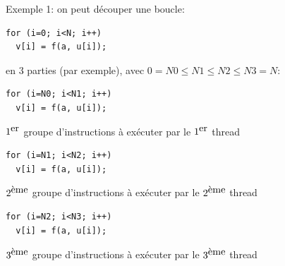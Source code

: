 \documentclass{beamer}
\begin{document}
\begin{frame}[fragile]
Exemple 1:
\vfill
on peut découper une boucle: 
\begin{lstlisting}
for (i=0; i<N; i++)
  v[i] = f(a, u[i]);
\end{lstlisting}

\vfill
en 3 parties (par exemple), avec $0 = N0 \leq N1 \leq N2 \leq N3 = N$:

\vfill
\begin{minipage}{0.52\textwidth}
	\begin{lstlisting}
for (i=N0; i<N1; i++)
  v[i] = f(a, u[i]);
\end{lstlisting}
\end{minipage}
\begin{minipage}{0.46\textwidth}
	$1^{\hbox{er}}$ groupe d'instructions à exécuter par le $1^{\hbox{er}}$ thread
\end{minipage}

\begin{minipage}{0.52\textwidth}
\begin{lstlisting}
for (i=N1; i<N2; i++)
  v[i] = f(a, u[i]);
\end{lstlisting}
\end{minipage}
\begin{minipage}{0.46\textwidth}
	$2^{\hbox{ème}}$ groupe d'instructions à exécuter par le $2^{\hbox{ème}}$ thread
\end{minipage}

\begin{minipage}{0.52\textwidth}
\begin{lstlisting}
for (i=N2; i<N3; i++)
  v[i] = f(a, u[i]);
\end{lstlisting}
\end{minipage}
\begin{minipage}{0.46\textwidth}
	$3^{\hbox{ème}}$ groupe d'instructions à exécuter par le $3^{\hbox{ème}}$ thread
\end{minipage}

\end{frame}
	
\end{document}
